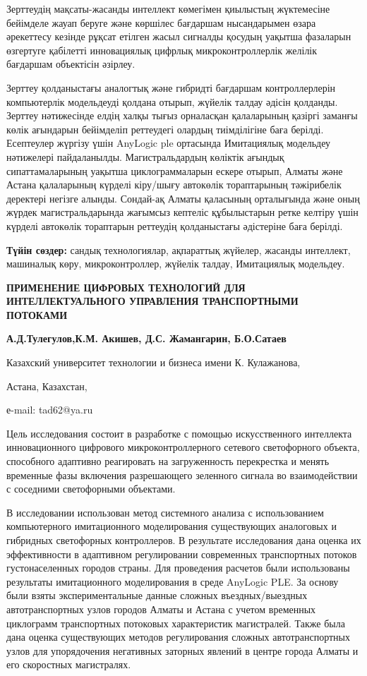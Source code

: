Зерттеудің мақсаты-жасанды интеллект көмегімен қиылыстың жүктемесіне
бейімделе жауап беруге және көршілес бағдаршам нысандарымен өзара
әрекеттесу кезінде рұқсат етілген жасыл сигналды қосудың уақытша
фазаларын өзгертуге қабілетті инновациялық цифрлық микроконтроллерлік
желілік бағдаршам объектісін әзірлеу.

Зерттеу қолданыстағы аналогтық және гибридті бағдаршам контроллерлерін
компьютерлік модельдеуді қолдана отырып, жүйелік талдау әдісін қолданды.
Зерттеу нәтижесінде елдің халқы тығыз орналасқан қалаларының қазіргі
заманғы көлік ағындарын бейімделіп реттеудегі олардың тиімділігіне баға
берілді. Есептеулер жүргізу үшін AnyLogic ple ортасында Имитациялық
модельдеу нәтижелері пайдаланылды. Магистральдардың көліктік ағындық
сипаттамаларының уақытша циклограммаларын ескере отырып, Алматы және
Астана қалаларының күрделі кіру/шығу автокөлік тораптарының тәжірибелік
деректері негізге алынды. Сондай-ақ Алматы қаласының орталығында және
оның жүрдек магистральдарында жағымсыз кептеліс құбылыстарын ретке
келтіру үшін күрделі автокөлік тораптарын реттеудің қолданыстағы
әдістеріне баға берілді.

{\bfseries Түйін сөздер:} сандық технологиялар, ақпараттық жүйелер, жасанды
интеллект, машиналық көру, микроконтроллер, жүйелік талдау, Имитациялық
модельдеу.

\begin{center}
{\large\bfseries ПРИМЕНЕНИЕ ЦИФРОВЫХ ТЕХНОЛОГИЙ ДЛЯ ИНТЕЛЛЕКТУАЛЬНОГО УПРАВЛЕНИЯ
ТРАНСПОРТНЫМИ ПОТОКАМИ}

{\bfseries А.Д.Тулегулов,К.М. Акишев, Д.С. Жамангарин, Б.О.Сатаев}

Казахский университет технологии и бизнеса имени К. Кулажанова,

Астана, Казахстан,

е-mail: tad62@ya.ru
\end{center}

Цель исследования состоит в разработке с помощью искусственного
интеллекта инновационного цифрового микроконтроллерного сетевого
светофорного объекта, способного адаптивно реагировать на загруженность
перекрестка и менять временные фазы включения разрешающего зеленного
сигнала во взаимодействии с соседними светофорными объектами.

В исследовании использован метод системного анализа с использованием
компьютерного имитационного моделирования существующих аналоговых и
гибридных светофорных контроллеров. В результате исследования дана
оценка их эффективности в адаптивном регулировании современных
транспортных потоков густонаселенных городов страны. Для проведения
расчетов были использованы результаты имитационного моделирования в
среде AnyLogic PLE. За основу были взяты экспериментальные данные
сложных въездных/выездных автотранспортных узлов городов Алматы и Астана
с учетом временных циклограмм транспортных потоковых характеристик
магистралей. Также была дана оценка существующих методов регулирования
сложных автотранспортных узлов для упорядочения негативных заторных
явлений в центре города Алматы и его скоростных магистралях.


